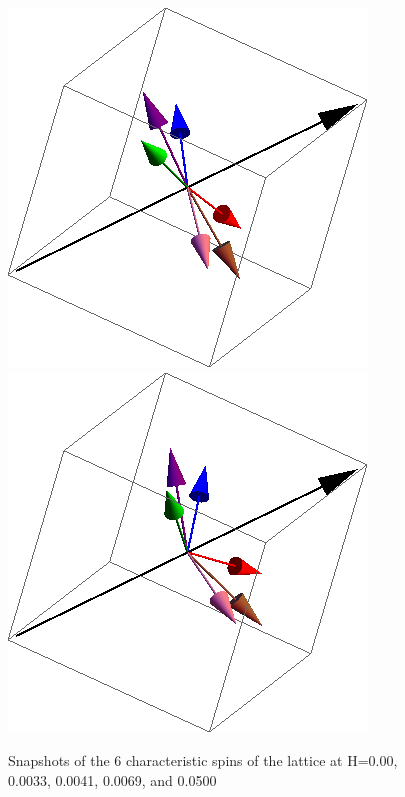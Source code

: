 \documentclass{article}
\begin{document}
\begin{figure}[ht]
\includegraphics[scale=0.27]{069S000to005R.png}
\includegraphics[scale=0.27]{501S000to005R.png}
\caption{Snapshots of the 6 characteristic spins of the lattice at H=0.00, 0.0033, 0.0041, 0.0069, and 0.0500}
\end{figure}
\end{document}

